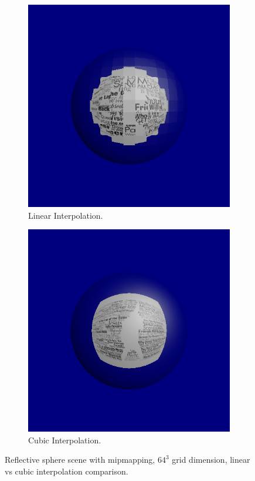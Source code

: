 \documentclass[12pt]{article}
\newcommand{\testlowres}{64}
\begin{document}
\begin{figure}[H]
	\centering
	\begin{subfigure}[b]{0.49\linewidth}
		\includegraphics[width=\linewidth]{images/spere_mirror_low_lod_linear}
		\caption{Linear Interpolation.}
	\end{subfigure}
	\begin{subfigure}[b]{0.49\linewidth}
		\includegraphics[width=\linewidth]{images/spere_mirror_low_lod_cubic}
		\caption{Cubic Interpolation.}
	\end{subfigure}
	\caption{Reflective sphere scene with mipmapping, $\testlowres^3$ grid dimension, linear vs cubic interpolation comparison.}
	\label{fig:testhighinterpolation}
\end{figure}
\end{document}
